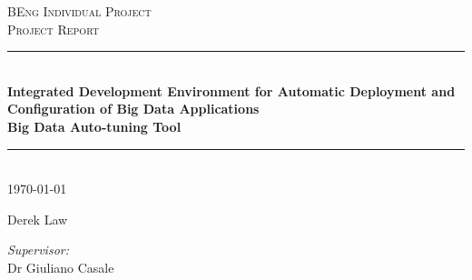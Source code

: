 
\begin{center}
\textsc{\LARGE BEng Individual Project} \\[0.5cm]
\textsc{\large Project Report}\\[1.3cm]

\rule{\linewidth}{0.5mm} \\[0.5cm]
{ \bfseries Integrated Development Environment for Automatic Deployment and Configuration of Big Data Applications }\\[0.3cm]
{ \Huge \bfseries Big Data Auto-tuning Tool }
\rule{\linewidth}{0.5mm} \\[1.5cm]
\today
\end{center}

\begin{flushleft}
Derek Law \\
\end{flushleft}

\begin{flushright}
\textit{Supervisor:}\\
Dr Giuliano Casale
\end{flushright}
\newpage
